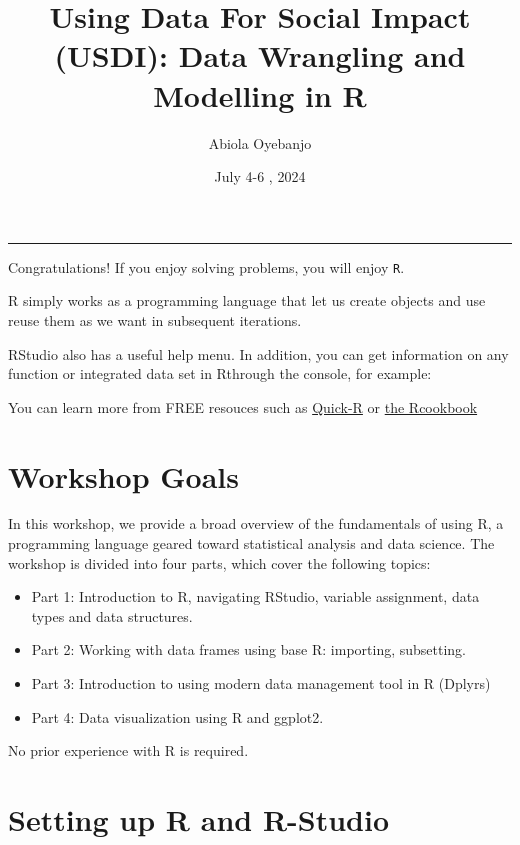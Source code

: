 \documentclass[
]{article}
\title{Using Data For Social Impact (USDI): Data Wrangling and Modelling
in R}
\author{Abiola Oyebanjo}
\date{July 4-6 , 2024}
\providecommand{\tightlist}{%
  \setlength{\itemsep}{0pt}\setlength{\parskip}{0pt}}
\begin{document}
\maketitle

{
\hypersetup{linkcolor=}
\setcounter{tocdepth}{2}
\tableofcontents
}
\begin{center}\rule{0.5\linewidth}{0.5pt}\end{center}

Congratulations! If you enjoy solving problems, you will enjoy
\texttt{R}.

R simply works as a programming language that let us create objects and
use reuse them as we want in subsequent iterations.

RStudio also has a useful help menu. In addition, you can get
information on any function or integrated data set in Rthrough the
console, for example:

You can learn more from FREE resouces such as
\href{http://www.statmethods.net}{Quick-R} or
\href{http://www.cookbook-r.com}{the Rcookbook}

\hypertarget{workshop-goals}{%
\section{Workshop Goals}\label{workshop-goals}}

In this workshop, we provide a broad overview of the fundamentals of
using R, a programming language geared toward statistical analysis and
data science. The workshop is divided into four parts, which cover the
following topics:

\begin{itemize}
\tightlist
\item
  Part 1: Introduction to R, navigating RStudio, variable assignment,
  data types and data structures.
\item
  Part 2: Working with data frames using base R: importing, subsetting.
\item
  Part 3: Introduction to using modern data management tool in R
  (Dplyrs)
\item
  Part 4: Data visualization using R and ggplot2.
\end{itemize}

No prior experience with R is required.

\hypertarget{setting-up-r-and-r-studio}{%
\section{Setting up R and R-Studio}\label{setting-up-r-and-r-studio}}
\end{document}
